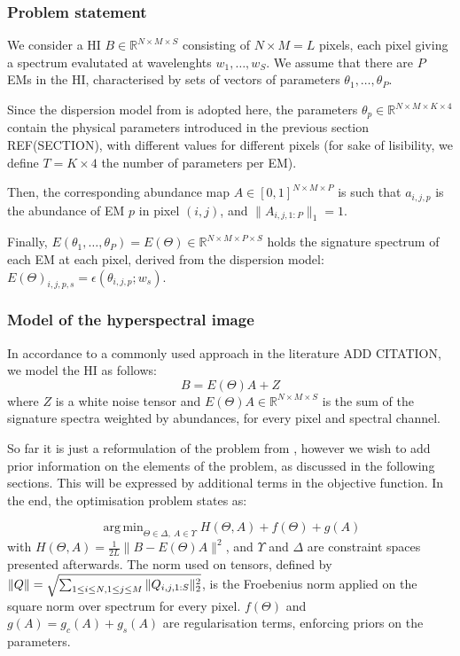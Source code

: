 \documentclass{article}
\DeclareMathOperator*{\argmin}{arg\,min}
\begin{document}
\subsubsection{Problem statement}

We consider a HI $B \in \mathbb{R}^{N \times M \times S}$ consisting of $N \times M = L$ pixels, each pixel giving a spectrum evalutated at wavelenghts $w_1,\dots, w_S$. We assume that there are $P$ EMs in the HI, characterised by sets of vectors of parameters $\theta_1,\dots, \theta_P$.

Since the dispersion model from \citet{janiczek_differentiable_2020} is adopted here, the parameters $\theta_p \in \mathbb{R}^{N \times M \times K \times 4}$ contain the physical parameters introduced in the previous section REF(SECTION), with different values for different pixels (for sake of lisibility, we define $T = K \times 4$ the number of parameters per EM).

Then, the corresponding abundance map $A \in [0, 1]^{N \times M\times P}$ is such that $a_{i, j, p}$ is the abundance of EM $p$ in pixel $(i, j)$, and $\|A_{i, j, 1:P}\|_1 = 1$.

Finally, $E(\theta_1,\dots, \theta_P) = E(\Theta) \in \mathbb{R}^{N \times M \times P \times S}$ holds the signature spectrum of each EM at each pixel, derived from the dispersion model: $E(\Theta)_{i, j, p, s} = \epsilon(\theta_{i, j, p}; w_s)$.

\subsubsection{Model of the hyperspectral image}

In accordance to a commonly used approach in the literature ADD CITATION, we model the HI as follows:
$$B = E(\Theta) A + Z$$
where $Z$ is a white noise tensor and $E(\Theta) A \in \mathbb{R}^{N \times M \times S}$ is the sum of the signature spectra weighted by abundances, for every pixel and spectral channel.

So far it is just a reformulation of the problem from \cite{janiczek_differentiable_2020}, however we wish to add prior information on the elements of the problem, as discussed in the following sections. This will be expressed by additional terms in the objective function. In the end, the optimisation problem states as:

\begin{equation}
  \label{eq:objective}
  \argmin_{\Theta \in \Delta,\ A \in \Upsilon} H(\Theta, A) + f(\Theta) + g(A)
\end{equation}
with $H(\Theta, A) = \frac{1}{2 L} \|B - E(\Theta) A\|^2$, and $\Upsilon$ and $\Delta$ are constraint spaces presented afterwards. The norm used on tensors, defined by $\|Q\| = \sqrt{\sum_{1 \leq i \leq N,\\1 \leq j \leq M} \|Q_{i, j, 1:S}\|_2^2}$, is the Froebenius norm applied on the square norm over spectrum for every pixel. $f(\Theta)$ and $g(A) = g_c(A) + g_s(A)$ are regularisation terms, enforcing priors on the parameters.
\end{document}
